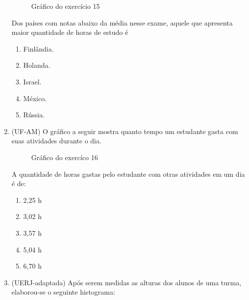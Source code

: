 \begin{enumerate}
\begin{figure}[H]
\centering
\capstart

\noindent{}
\caption{Gráfico do exercício 15}\label{\detokenize{PE103-E:id8}}\label{\detokenize{PE103-E:id25}}\end{figure}

Dos países com notas abaixo da média nesse exame, aquele que apresenta maior quantidade de horas de estudo é
\begin{enumerate}
\item {} 
Finlândia.

\item {} 
Holanda.

\item {} 
Israel.

\item {} 
México.

\item {} 
Rússia.

\end{enumerate}

\item (UF-AM) O gráfico a seguir mostra quanto tempo um estudante gasta com suas atividades durante o dia.

\begin{figure}[H]
\centering
\capstart

\noindent{}
\caption{Gráfico do exercíco 16}\label{\detokenize{PE103-E:id9}}\label{\detokenize{PE103-E:id26}}\end{figure}

A quantidade de horas gastas pelo estudante com otras atividades em um dia é de:
\begin{enumerate}
\item {} 
2,25 h

\item {} 
3,02 h

\item {} 
3,57 h

\item {} 
5,04 h

\item {} 
6,70 h

\end{enumerate}

\item (UERJ-adaptada)  Após serem medidas as alturas dos alunos de uma turma, elaborou-se o seguinte histograma:


\end{enumerate}
